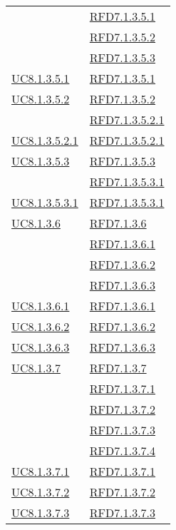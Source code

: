 \begin{longtable}{|>{\centering}m{5cm}|m{5cm}<{\centering}|}
& \hyperlink{RFD7.1.3.5.1}{RFD7.1.3.5.1}\\
& \hyperlink{RFD7.1.3.5.2}{RFD7.1.3.5.2}\\
& \hyperlink{RFD7.1.3.5.3}{RFD7.1.3.5.3}\\ \hline
\hyperref[UC8.1.3.5.1]{UC8.1.3.5.1} & \hyperlink{RFD7.1.3.5.1}{RFD7.1.3.5.1}\\ \hline
\hyperref[UC8.1.3.5.2]{UC8.1.3.5.2} & \hyperlink{RFD7.1.3.5.2}{RFD7.1.3.5.2}\\
& \hyperlink{RFD7.1.3.5.2.1}{RFD7.1.3.5.2.1}\\ \hline
\hyperref[UC8.1.3.5.2.1]{UC8.1.3.5.2.1} & \hyperlink{RFD7.1.3.5.2.1}{RFD7.1.3.5.2.1}\\ \hline
\hyperref[UC8.1.3.5.3]{UC8.1.3.5.3} & \hyperlink{RFD7.1.3.5.3}{RFD7.1.3.5.3}\\
& \hyperlink{RFD7.1.3.5.3.1}{RFD7.1.3.5.3.1}\\ \hline
\hyperref[UC8.1.3.5.3.1]{UC8.1.3.5.3.1} & \hyperlink{RFD7.1.3.5.3.1}{RFD7.1.3.5.3.1}\\ \hline
\hyperref[UC8.1.3.6]{UC8.1.3.6} & \hyperlink{RFD7.1.3.6}{RFD7.1.3.6}\\
& \hyperlink{RFD7.1.3.6.1}{RFD7.1.3.6.1}\\
& \hyperlink{RFD7.1.3.6.2}{RFD7.1.3.6.2}\\
& \hyperlink{RFD7.1.3.6.3}{RFD7.1.3.6.3}\\ \hline
\hyperref[UC8.1.3.6.1]{UC8.1.3.6.1} & \hyperlink{RFD7.1.3.6.1}{RFD7.1.3.6.1}\\ \hline
\hyperref[UC8.1.3.6.2]{UC8.1.3.6.2} & \hyperlink{RFD7.1.3.6.2}{RFD7.1.3.6.2}\\ \hline
\hyperref[UC8.1.3.6.3]{UC8.1.3.6.3} & \hyperlink{RFD7.1.3.6.3}{RFD7.1.3.6.3}\\ \hline
\hyperref[UC8.1.3.7]{UC8.1.3.7} & \hyperlink{RFD7.1.3.7}{RFD7.1.3.7}\\
& \hyperlink{RFD7.1.3.7.1}{RFD7.1.3.7.1}\\
& \hyperlink{RFD7.1.3.7.2}{RFD7.1.3.7.2}\\
& \hyperlink{RFD7.1.3.7.3}{RFD7.1.3.7.3}\\
& \hyperlink{RFD7.1.3.7.4}{RFD7.1.3.7.4}\\ \hline
\hyperref[UC8.1.3.7.1]{UC8.1.3.7.1} & \hyperlink{RFD7.1.3.7.1}{RFD7.1.3.7.1}\\ \hline
\hyperref[UC8.1.3.7.2]{UC8.1.3.7.2} & \hyperlink{RFD7.1.3.7.2}{RFD7.1.3.7.2}\\ \hline
\hyperref[UC8.1.3.7.3]{UC8.1.3.7.3} & \hyperlink{RFD7.1.3.7.3}{RFD7.1.3.7.3}\\ \hline

\end{longtable}
